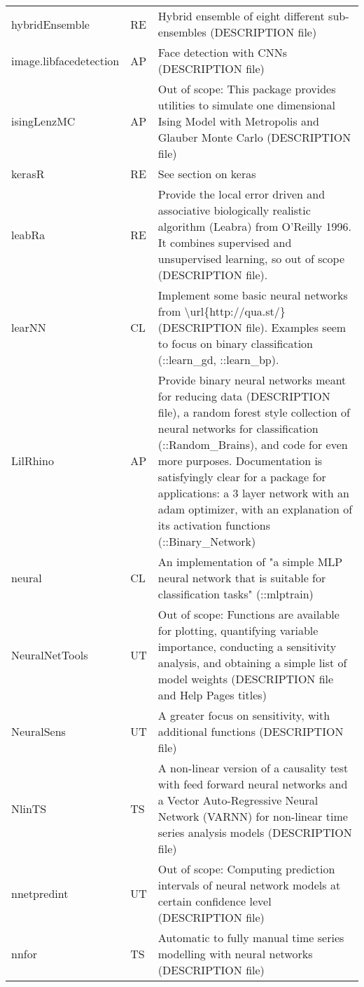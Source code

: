 \begin{Schunk}
\begin{longtable}[t]{ll>{\raggedright\arraybackslash}p{10cm}}
hybridEnsemble & RE & Hybrid ensemble of eight different sub-ensembles (DESCRIPTION file)\\
\addlinespace
image.libfacedetection & AP & Face detection with CNNs (DESCRIPTION file)\\
isingLenzMC & AP & Out of scope: This package provides utilities to simulate one dimensional Ising Model with Metropolis and Glauber Monte Carlo (DESCRIPTION file)\\
kerasR & RE & See section on keras\\
leabRa & RE & Provide the local error driven and associative biologically realistic algorithm (Leabra) from O'Reilly 1996. It combines supervised and unsupervised learning, so out of scope (DESCRIPTION file).\\
learNN & CL & Implement some basic neural networks from \textbackslash{}url\{http://qua.st/\} (DESCRIPTION file). Examples seem to focus on binary classification (::learn\_gd, ::learn\_bp).\\
\addlinespace
LilRhino & AP & Provide binary neural networks meant for reducing data (DESCRIPTION file), a random forest style collection of neural networks for classification (::Random\_Brains), and code for even more purposes. Documentation is satisfyingly clear for a package for applications: a 3 layer network with an adam optimizer, with an explanation of its activation functions (::Binary\_Network)\\
neural & CL & An implementation of "a simple MLP neural network that is suitable for classification tasks" (::mlptrain)\\
NeuralNetTools & UT & Out of scope: Functions are available for plotting, quantifying variable importance, conducting a sensitivity analysis, and obtaining a simple list of model weights (DESCRIPTION file and Help Pages titles)\\
NeuralSens & UT & A greater focus on sensitivity, with additional functions (DESCRIPTION file)\\
NlinTS & TS & A non-linear version of a causality test with feed forward neural networks and a Vector Auto-Regressive Neural Network (VARNN) for non-linear time series analysis models (DESCRIPTION file)\\
\addlinespace
nnetpredint & UT & Out of scope: Computing prediction intervals of neural network models at certain confidence level (DESCRIPTION file)\\
nnfor & TS & Automatic to fully manual time series modelling with neural networks (DESCRIPTION file)\\

\end{longtable}
\end{Schunk}
